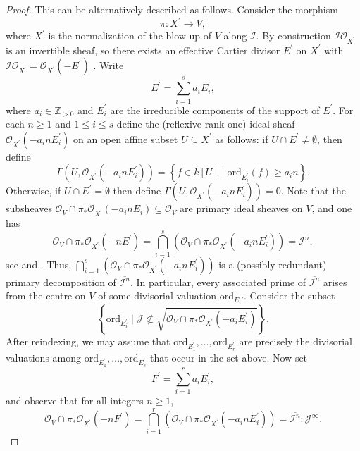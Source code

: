 \documentclass[12pt,a4paper]{amsart}
\theoremstyle{plain}
\theoremstyle{definition}
\numberwithin{equation}{theorem}
\begin{document}
\begin{proof}
This can be alternatively described as follows. Consider the morphism $$\pi\colon X^{\prime} \longrightarrow V,$$ where $X^{\prime}$ is the normalization of the blow-up of $V$ along $\mathcal{I}$. By construction $\mathcal{I}\mathcal{O}_{X^{\prime}}$ is an invertible sheaf, so there exists an effective Cartier divisor $E^{\prime}$ on $X^{\prime}$ with $\mathcal{I}\mathcal{O}_{X^{\prime}} = \mathcal{O}_{X^{\prime}}(-E^{\prime})$ . Write $$E^{\prime} = \sum_{i=1}^{s} a_i E_i^{\prime},$$ where $a_i\in\mathbb{Z}_{>0}$ and $E_i^{\prime}$ are the irreducible components of the support of $E^{\prime}$. For each $n\geq 1$ and $1\leq i\leq s$ define the (reflexive rank one) ideal sheaf $\mathcal{O}_{X^{\prime}}(-a_inE_i^{\prime})$ on an open affine subset $U \subseteq X^{\prime}$ as follows: if $U\cap E^{\prime} \neq \emptyset$, then define $$\Gamma\left(U,\mathcal{O}_{X^{\prime}}(-a_inE_i^{\prime})\right) = \left\{f\in k[U] \mid \mathrm{ord}_{E_i^{\prime}}(f)\geq a_in\right\}.$$ Otherwise, if $U\cap E^{\prime} = \emptyset$ then define $\Gamma\left(U,\mathcal{O}_{X^{\prime}}(-a_inE_i^{\prime})\right)=0$. Note that the subsheaves $\mathcal{O}_{V} \cap \pi_*\mathcal{O}_{X^{\prime}}(-a_inE_i) \subseteq \mathcal{O}_{V}$ are primary ideal sheaves on $V$, and one has
\begin{equation}\label{reesval0}
\mathcal{O}_{V} \cap \pi_*\mathcal{O}_{X^{\prime}}(-nE^{\prime}) = \bigcap_{i=1}^s \left(\mathcal{O}_{V} \cap \pi_*\mathcal{O}_{X^{\prime}}(-a_inE_i^{\prime})\right) =  \overline{\mathcal{I}^n},
\end{equation}
see \cite[Section 9.6.A]{Laz04b} and \cite[Chapter 10]{HS06}. Thus, $\bigcap_{i=1}^s \left(\mathcal{O}_{V} \cap \pi_*\mathcal{O}_{X^{\prime}}(-a_inE_i^{\prime})\right)$ is a (possibly redundant) primary decomposition of $\overline{\mathcal{I}^n}$. In particular, every associated prime of $\overline{\mathcal{I}^n}$ arises from the centre on $V$ of some divisorial valuation $\mathrm{ord}_{E_i'}$. Consider the subset $$\left\{\mathrm{ord}_{E_i^{\prime}} \mid \mathcal{J} \not\subset \sqrt{\mathcal{O}_{V} \cap \pi_*\mathcal{O}_{X^{\prime}}(-a_iE_i^{\prime})}\right\}.$$ After reindexing, we may assume that $\mathrm{ord}_{E_1^{\prime}},\ldots,\mathrm{ord}_{E_r^{\prime}}$ are precisely the divisorial valuations among $\mathrm{ord}_{E_1^{\prime}},\ldots,\mathrm{ord}_{E_s^{\prime}}$ that occur in the set above. Now set $$F^{\prime}=\sum_{i=1}^{r} a_i E_i^{\prime},$$ and observe that for all integers $n\geq 1$,
\begin{equation}\label{reesval1}
 \mathcal{O}_V \cap \pi_*\mathcal{O}_{X^{\prime}}(-nF^{\prime}) = \bigcap_{i=1}^r \left(\mathcal{O}_{V} \cap \pi_*\mathcal{O}_{X^{\prime}}(-a_inE_i^{\prime})\right) = \overline{\mathcal{I}^n} : \mathcal{J}^{\infty}.
\end{equation}


\end{proof}
\end{document}
